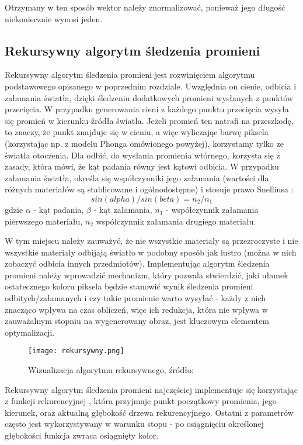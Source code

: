 Otrzymany w ten sposób wektor należy znormalizować, ponieważ jego długość niekoniecznie wynosi jeden.

 
\subsection{Rekursywny algorytm śledzenia promieni}

Rekursywny algorytm śledzenia promieni \cite{foley95} jest rozwinięciem algorytmu podstawowego opisanego w poprzednim rozdziale. Uwzględnia on cienie, odbicia i załamania światła, dzięki śledzeniu dodatkowych promieni wysłanych z punktów przecięcia. W przypadku generowania cieni z każdego punktu przecięcia wysyła się promień w kierunku źródła światła. Jeżeli promień ten natrafi na przeszkodę, to znaczy, że punkt znajduje się w cieniu, a więc wyliczając barwę piksela (korzystając np. z modelu Phonga omówionego powyżej), korzystamy tylko ze światła otoczenia. Dla odbić, do wysłania promienia wtórnego, korzysta się z zasady, która mówi, że kąt padania równy jest kątowi odbicia. W przypadku załamania światła, określa się współczynniki jego załamania (wartości dla różnych materiałów są stablicowane i ogólnodostępne) i stosuje prawo Snelliusa \cite{snellius}:
$$sin(alpha)/sin(beta) = n_2/n_1$$
gdzie $\alpha$ - kąt padania, $\beta$ - kąt załamania, $n_1$ - współczynnik załamania pierwszego materiału, $n_2$ współczynnik załamania drugiego materiału.


W tym miejscu należy zauważyć, że nie wszystkie materiały są przezroczyste i nie wszystkie materiały odbijają światło w podobny sposób jak lustro (można w nich zobaczyć odbicia innych przedmiotów). Implementując algorytm śledzenia promieni należy wprowadzić mechanizm, który pozwala stwierdzić, jaki ułamek ostatecznego koloru piksela będzie stanowić wynik śledzenia promieni odbitych/załamanych i czy takie promienie warto wysyłać - każdy z nich znacząco wpływa na czas obliczeń, więc ich redukcja, która nie wpływa w zauważalnym stopniu na wygenerowany obraz, jest kluczowym elementem optymalizacji.


\begin{figure}[h!]
\centering
  \caption{Wizualizacja algorytmu rekursywnego, źródło: \cite{scratch}}
  \texttt{[image: rekursywny.png]}
\end{figure}

Rekursywny algorytm śledzenia promieni najczęściej implementuje się korzystając z funkcji rekurencyjnej \cite{suffern2007}, która przyjmuje punkt początkowy promienia, jego kierunek, oraz aktualną głębokość drzewa rekurencyjnego. Ostatni z parametrów często jest wykorzystywany w warunku stopu - po osiągnięciu określonej głębokości funkcja zwraca osiągnięty kolor.


